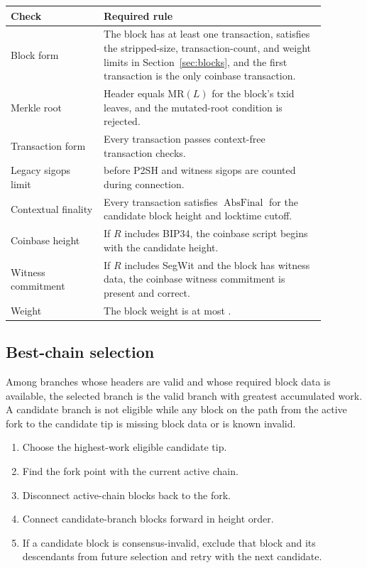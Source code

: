 \begin{longtable}{@{}L{0.26\linewidth}L{0.62\linewidth}@{}}
\toprule
Check & Required rule \\
\midrule
Block form & The block has at least one transaction, satisfies the stripped-size, transaction-count, and weight limits in Section~\ref{sec:blocks}, and the first transaction is the only coinbase transaction. \\
Merkle root & Header  equals \(\mathrm{MR}(L)\) for the block's txid leaves, and the mutated-root condition is rejected. \\
Transaction form & Every transaction passes context-free transaction checks. \\
Legacy sigops limit &  before P2SH and witness sigops are counted during connection. \\
Contextual finality & Every transaction satisfies \(\operatorname{AbsFinal}\) for the candidate block height and locktime cutoff. \\
Coinbase height & If \(R\) includes BIP34, the coinbase script begins with the candidate height. \\
Witness commitment & If \(R\) includes SegWit and the block has witness data, the coinbase witness commitment is present and correct. \\
Weight & The block weight is at most . \\
\bottomrule
\end{longtable}

\subsection{Best-chain selection}

Among branches whose headers are valid and whose required block data is
available, the selected branch is the valid branch with greatest accumulated
work. A candidate branch is not eligible while any block on the path from the
active fork to the candidate tip is missing block data or is known invalid.

\begin{enumerate}[leftmargin=*]
  \item Choose the highest-work eligible candidate tip.
  \item Find the fork point with the current active chain.
  \item Disconnect active-chain blocks back to the fork.
  \item Connect candidate-branch blocks forward in height order.
  \item If a candidate block is consensus-invalid, exclude that block and its
        descendants from future selection and retry with the next candidate.
\end{enumerate}

